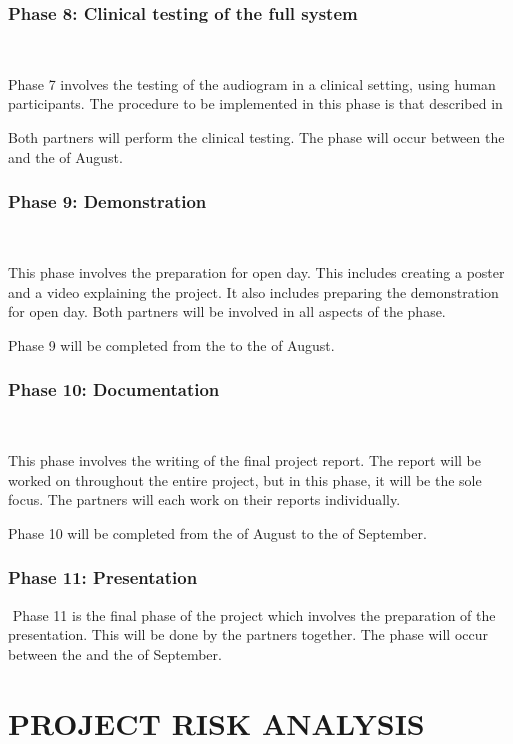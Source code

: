 \documentclass[10pt,twocolumn]{witseiepaper}
\begin{document}
\subsubsection*{Phase 8: Clinical testing of the full system} $    $

Phase 7 involves the testing of the audiogram in a clinical setting, using human participants. The procedure to be implemented in this phase is that described in 

Both partners will perform the clinical testing. The phase will occur between the  and the  of August.

\subsubsection*{Phase 9: Demonstration} $    $

This phase involves the preparation for open day. This includes creating a poster and a video explaining the project. It also includes preparing the demonstration for open day. Both partners will be involved in all aspects of the phase.

Phase 9 will be completed from the  to the  of August.

\subsubsection*{Phase 10: Documentation} $    $

This phase involves the writing of the final project report. The report will be worked on throughout the entire project, but in this phase, it will be the sole focus. The partners will each work on their reports individually. 

Phase 10 will be completed from the  of August to the  of September.

\subsubsection*{Phase 11: Presentation} $    $
Phase 11 is the final phase of the project which involves the preparation of the presentation. This will be done by the partners together. The phase will occur between the  and the  of September.


\section{PROJECT RISK ANALYSIS}
\end{document}
